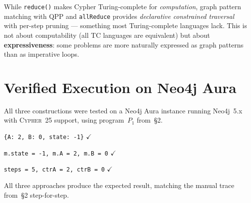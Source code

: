 \documentclass[11pt,a4paper]{article}
\begin{document}
\begin{factbox}
While \texttt{reduce()} makes Cypher Turing-complete for
\emph{computation}, graph pattern matching with QPP and
\texttt{allReduce} provides \emph{declarative constrained
traversal} with per-step pruning --- something most
Turing-complete languages lack. This is not about computability
(all TC languages are equivalent) but about \textbf{expressiveness}:
some problems are more naturally expressed as graph patterns than
as imperative loops.
\end{factbox}


\section{Verified Execution on Neo4j Aura}

All three constructions were tested on a Neo4j Aura instance running
Neo4j~5.x with \textsc{Cypher~25} support, using program~$P_1$ from~\S2.

\begin{resultbox}
\texttt{\{A: 2, B: 0, state: -1\}} \quad$\checkmark$
\end{resultbox}

\begin{resultbox}
\texttt{m.state = -1, m.A = 2, m.B = 0} \quad$\checkmark$
\end{resultbox}

\begin{resultbox}
\texttt{steps = 5, ctrA = 2, ctrB = 0} \quad$\checkmark$
\end{resultbox}

All three approaches produce the expected result, matching the manual
trace from~\S2 step-for-step.
\end{document}

